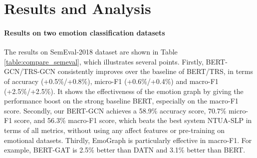 \documentclass[11pt,a4paper]{article}
\begin{document}
\begin{table}[t]
\centering
{}
\caption{Comparisons among different systems on Twitter dataset.}
\label{table:compare_twitter}
\end{table}


\begin{table*}[t]
\centering
{}
\caption{Comparisons of F1 scores and accuracy between EmoGraph w/ and w/o graph on IEMOCAP dataset. }
\label{table:compare_iemocap}
\end{table*}
\section{Results and Analysis}

\paragraph{Results on two emotion classification datasets} The results on SemEval-2018 dataset are shown in Table \ref{table:compare_semeval}, which illustrates several points. Firstly, BERT-GCN/TRS-GCN consistently improves over the baseline of BERT/TRS, in terms of accuracy (+0.5\%/+0.8\%), micro-F1 (+0.6\%/+0.4\%) and macro-F1 (+2.5\%/+2.5\%). It shows the effectiveness of the emotion graph by giving the performance boost on the strong baseline BERT, especially on the macro-F1 score.
Secondly, our BERT-GCN achieves a 58.9\% accuracy score, 70.7\% micro-F1 score, and 56.3\% macro-F1 score, which beats the best system NTUA-SLP in terms of all metrics, without using any affect features or pre-training on emotional datasets. 
Thirdly, EmoGraph is particularly effective in macro-F1. For example, BERT-GAT is 2.5\% better than DATN and 3.1\% better than BERT.
\end{document}
